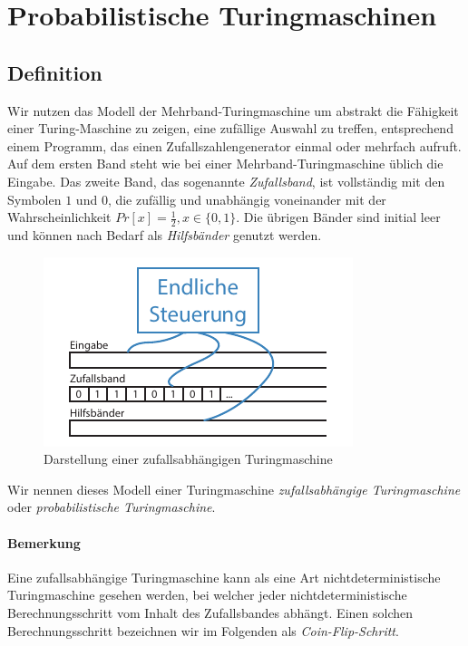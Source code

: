 \section{Probabilistische Turingmaschinen}
\subsection{Definition}
Wir nutzen das Modell der Mehrband-Turingmaschine um abstrakt die Fähigkeit einer Turing-Maschine zu zeigen, eine zufällige Auswahl zu treffen, entsprechend einem Programm, das einen Zufallszahlengenerator einmal oder mehrfach aufruft.
Auf dem ersten Band steht wie bei einer Mehrband-Turingmaschine üblich die Eingabe.
Das zweite Band, das sogenannte \emph{Zufallsband}, ist vollständig mit den Symbolen $1$ und $0$, die zufällig und unabhängig voneinander mit der Wahrscheinlichkeit $Pr[x] = \frac{1}{2}, x \in \{0, 1\}$.
Die übrigen Bänder sind initial leer und können nach Bedarf als \emph{Hilfsbänder} genutzt werden.

\begin{figure}[h]
	\centering
	\includegraphics[width=.8\textwidth]{Graphics/Probabilistic_TM}	
	\caption{Darstellung einer zufallsabhängigen Turingmaschine}
	\label{fig:probabilistic_tm}
\end{figure}

Wir nennen dieses Modell einer Turingmaschine \emph{zufallsabhängige Turingmaschine} oder \emph{probabilistische Turingmaschine}.

\paragraph{Bemerkung}
Eine zufallsabhängige Turingmaschine kann als eine Art nichtdeterministische Turingmaschine gesehen werden, bei welcher jeder nichtdeterministische Berechnungsschritt vom Inhalt des Zufallsbandes abhängt.
Einen solchen Berechnungsschritt bezeichnen wir im Folgenden als \emph{Coin-Flip-Schritt}.


